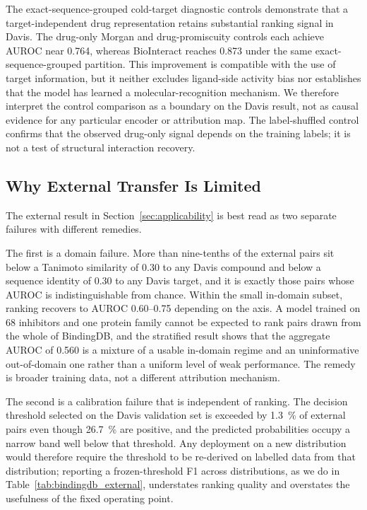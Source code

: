 \documentclass[fleqn,10pt]{wlscirep}
\begin{document}
The exact-sequence-grouped cold-target diagnostic controls demonstrate that a target-independent
drug representation retains substantial ranking signal in Davis.  The
drug-only Morgan and drug-promiscuity controls each achieve AUROC near 0.764,
whereas BioInteract reaches 0.873 under the same exact-sequence-grouped
partition.  This improvement is compatible with the use of target information,
but it neither excludes ligand-side activity bias nor establishes that the model
has learned a molecular-recognition mechanism.  We therefore interpret the
control comparison as a boundary on the Davis result, not as causal evidence for
any particular encoder or attribution map.  The label-shuffled control confirms
that the observed drug-only signal depends on the training labels; it is not a
test of structural interaction recovery.

\subsection{Why External Transfer Is Limited}
\label{sec:transfer}

The external result in Section~\ref{sec:applicability} is best read as two
separate failures with different remedies.

The first is a domain failure.  More than nine-tenths of the external pairs sit
below a Tanimoto similarity of 0.30 to any Davis compound and below a sequence
identity of 0.30 to any Davis target, and it is exactly those pairs whose AUROC
is indistinguishable from chance.  Within the small in-domain subset, ranking
recovers to AUROC 0.60--0.75 depending on the axis.  A model trained on 68
inhibitors and one protein family cannot be expected to rank pairs drawn from
the whole of BindingDB, and the stratified result shows that the aggregate
AUROC of 0.560 is a mixture of a usable in-domain regime and an uninformative
out-of-domain one rather than a uniform level of weak performance.  The remedy
is broader training data, not a different attribution mechanism.

The second is a calibration failure that is independent of ranking.  The
decision threshold selected on the Davis validation set is exceeded by
\SI{1.3}{\percent} of external pairs even though \SI{26.7}{\percent} are
positive, and the predicted probabilities occupy a narrow band well below that
threshold.  Any deployment on a new distribution would therefore require the
threshold to be re-derived on labelled data from that distribution; reporting a
frozen-threshold F1 across distributions, as we do in
Table~\ref{tab:bindingdb_external}, understates ranking quality and overstates
the usefulness of the fixed operating point.
\end{document}
